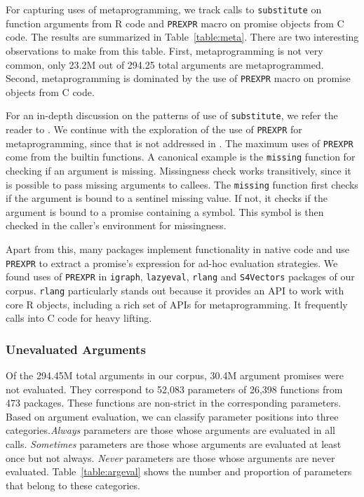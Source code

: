\documentclass[review,nonacm,screen,acmsmall,anonymous=true]{acmart}
\newcommand{\always}{\emph{Always}\xspace}
\newcommand{\sometimes}{\emph{Sometimes}\xspace}
\newcommand{\never}{\emph{Never}\xspace}
\newcommand{\code}[1]{\lstinline |#1|\xspace}
\begin{document}
For capturing uses of metaprogramming, we track calls to \code{substitute} on
function arguments from R code and \code{PREXPR} macro on promise objects from C
code. The results are summarized in Table~\ref{table:meta}. There are two
interesting observations to make from this table. First, metaprogramming is not
very common, only 23.2M out of 294.25 total arguments are metaprogrammed.
Second, metaprogramming is dominated by the use of \code{PREXPR} macro on
promise objects from C code.

For an in-depth discussion on the patterns of use of \code{substitute}, we refer
the reader to \citet{oopsla19b}. We continue with the exploration of the use of
\code{PREXPR} for metaprogramming, since that is not addressed in
\cite{oopsla19b}. The maximum uses of \code{PREXPR} come from the builtin
functions.
A canonical example is the \code{missing} function for checking if an
argument is missing. Missingness check works transitively, since it is possible
to pass missing arguments to callees. The \code{missing} function first checks
if the argument is bound to a sentinel missing value. If not, it checks if the
argument is bound to a promise containing a symbol. This symbol is then checked
in the caller's environment for missingness.

Apart from this, many packages implement functionality in native code and use
\code{PREXPR} to extract a promise's expression for ad-hoc evaluation
strategies. We found uses of \code{PREXPR} in \code{igraph}, \code{lazyeval},
\code{rlang} and \code{S4Vectors} packages of our corpus. \code{rlang}
particularly stands out because it provides an API to work with core R objects,
including a rich set of APIs for metaprogramming. It frequently calls into C
code for heavy lifting.

\subsubsection{Unevaluated Arguments}
Of the 294.45M total arguments in our corpus, 30.4M argument promises were not
evaluated. They correspond to 52,083 parameters of 26,398 functions from 473
packages. These functions are non-strict in the corresponding parameters.
%
Based on argument evaluation, we can classify parameter positions into three
categories.\always parameters are those whose arguments are evaluated in all
calls. \sometimes parameters are those whose arguments are evaluated at least
once but not always. \never parameters are those whose arguments are never
evaluated. Table~\ref{table:argeval} shows the number and proportion of
parameters that belong to these categories.
\end{document}
